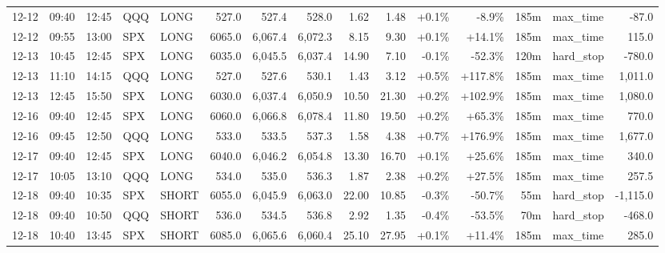 \documentclass[11pt,a4paper,twoside]{article}
\begin{document}
\begin{landscape}
\begin{center}
\begin{longtable}{>{\color{txtmain}}l l l l l r r r r r r r r >{\color{txtmain}}l r}
12-12 & 09:40 & 12:45 & QQQ & LONG & 527.0 & 527.4 & 528.0 & 1.62 & 1.48 & \textcolor{wingreen}{+0.1\%} & \textcolor{lossred}{-8.9\%} & 185m & max\_time & \textcolor{lossred}{-87.0} \\
12-12 & 09:55 & 13:00 & SPX & LONG & 6065.0 & 6,067.4 & 6,072.3 & 8.15 & 9.30 & \textcolor{wingreen}{+0.1\%} & \textcolor{wingreen}{+14.1\%} & 185m & max\_time & \textcolor{wingreen}{115.0} \\
12-13 & 10:45 & 12:45 & SPX & LONG & 6035.0 & 6,045.5 & 6,037.4 & 14.90 & 7.10 & \textcolor{lossred}{-0.1\%} & \textcolor{lossred}{-52.3\%} & 120m & hard\_stop & \textcolor{lossred}{-780.0} \\
12-13 & 11:10 & 14:15 & QQQ & LONG & 527.0 & 527.6 & 530.1 & 1.43 & 3.12 & \textcolor{wingreen}{+0.5\%} & \textcolor{wingreen}{+117.8\%} & 185m & max\_time & \textcolor{wingreen}{1,011.0} \\
12-13 & 12:45 & 15:50 & SPX & LONG & 6030.0 & 6,037.4 & 6,050.9 & 10.50 & 21.30 & \textcolor{wingreen}{+0.2\%} & \textcolor{wingreen}{+102.9\%} & 185m & max\_time & \textcolor{wingreen}{1,080.0} \\
12-16 & 09:40 & 12:45 & SPX & LONG & 6060.0 & 6,066.8 & 6,078.4 & 11.80 & 19.50 & \textcolor{wingreen}{+0.2\%} & \textcolor{wingreen}{+65.3\%} & 185m & max\_time & \textcolor{wingreen}{770.0} \\
12-16 & 09:45 & 12:50 & QQQ & LONG & 533.0 & 533.5 & 537.3 & 1.58 & 4.38 & \textcolor{wingreen}{+0.7\%} & \textcolor{wingreen}{+176.9\%} & 185m & max\_time & \textcolor{wingreen}{1,677.0} \\
12-17 & 09:40 & 12:45 & SPX & LONG & 6040.0 & 6,046.2 & 6,054.8 & 13.30 & 16.70 & \textcolor{wingreen}{+0.1\%} & \textcolor{wingreen}{+25.6\%} & 185m & max\_time & \textcolor{wingreen}{340.0} \\
12-17 & 10:05 & 13:10 & QQQ & LONG & 534.0 & 535.0 & 536.3 & 1.87 & 2.38 & \textcolor{wingreen}{+0.2\%} & \textcolor{wingreen}{+27.5\%} & 185m & max\_time & \textcolor{wingreen}{257.5} \\
12-18 & 09:40 & 10:35 & SPX & SHORT & 6055.0 & 6,045.9 & 6,063.0 & 22.00 & 10.85 & \textcolor{lossred}{-0.3\%} & \textcolor{lossred}{-50.7\%} & 55m & hard\_stop & \textcolor{lossred}{-1,115.0} \\
12-18 & 09:40 & 10:50 & QQQ & SHORT & 536.0 & 534.5 & 536.8 & 2.92 & 1.35 & \textcolor{lossred}{-0.4\%} & \textcolor{lossred}{-53.5\%} & 70m & hard\_stop & \textcolor{lossred}{-468.0} \\
12-18 & 10:40 & 13:45 & SPX & SHORT & 6085.0 & 6,065.6 & 6,060.4 & 25.10 & 27.95 & \textcolor{wingreen}{+0.1\%} & \textcolor{wingreen}{+11.4\%} & 185m & max\_time & \textcolor{wingreen}{285.0} \\

\end{longtable}
\end{center}
\end{landscape}
\end{document}

